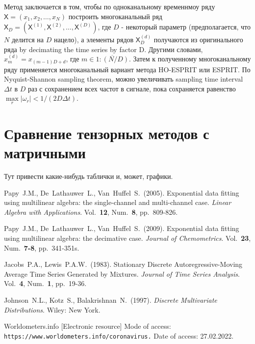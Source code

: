 \documentclass[12pt]{article}
\newcommand{\tX}{\mathsf{X}}
\theoremstyle{definition}
\theoremstyle{remark}
\begin{document}
Метод заключается в том, чтобы по одноканальному временнмоу ряду
$\tX = (x_1, x_2, \ldots, x_N)$ построить многоканальный ряд
$\tX_D = (\tX^{(1)}, \tX^{(2)}, \ldots, \tX^{(D)})$,
где $D$ - некоторый параметр (предполагается, что $N$ делится на $D$ нацело),
а элементы рядов $\tX_D^{(d)}$ получаются из оригинального ряда by
decimating the time series by factor D.
Другими словами, $x_m^{(d)} = x_{(m-1)D + d}$, где $m \in \overline{1:(N/D)}$.
Затем к полученному многоканальному ряду применяется многоканальный
вариант метода HO-ESPRIT или ESPRIT.
По Nyquist-Shannon sampling theorem, можно увеличивать sampling time
interval $\Delta t$ в $D$ раз с сохранением всех частот в сигнале, пока
сохраняется равенство $\max\limits_{r}\left|\omega_r\right| < 1 / (2
D \Delta t)$.


\section{Сравнение тензорных методов с матричными}
Тут привести какие-нибудь таблички и, может, графики.

\begin{thebibliography}{10}

  Papy~J.M., De~Lathauwer~L., Van~Huffel~S.~(2005).
  Exponential data fitting using multilinear algebra: the
  single-channel and multi-channel case.
  {\sl Linear Algebra with Applications}. Vol.~{\bf 12}, Num.~{\bf 8},
  pp.~809-826.

  Papy~J.M., De~Lathauwer~L., Van~Huffel~S.~(2009).
  Exponential data fitting using multilinear algebra: the decimative case.
  {\sl Journal of Chemometrics}. Vol.~{\bf 23}, Num.~{\bf 7-8},
  pp.~341-351s.

  Jacobs~P.A., Lewis~P.A.W.~(1983). Stationary Discrete
  Autoregressive-Moving Average
  Time Series Generated by Mixtures. {\sl Journal of Time Series
  Analysis}. Vol.~{\bf 4}, Num.~{\bf 1},
  pp.~19-36.

  Johnson~N.L., Kotz~S., Balakrishnan~N.~(1997). {\sl Discrete
  Multivariate Distributions}. Wiley: New York.

  Worldometers.info [Electronic resource] Mode of access:
  \texttt{https://www.worldometers.info/coronavirus.} Date of access:
  27.02.2022.

\end{thebibliography}
\end{document}
